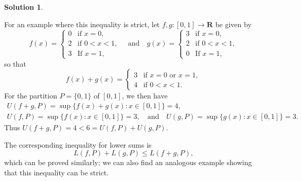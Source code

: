 \documentclass[12pt]{article}
\theoremstyle{definition}
\theoremstyle{exercise}
\theoremstyle{solution}
\newtheorem*{solution}{Solution}
\newcommand{\quand}{\quad \text{and} \quad}
\newcommand{\R}{\mathbf{R}}
\begin{document}
\begin{solution}
\begin{enumerate}
        For an example where this inequality is strict, let \( f, g : [0, 1] \to \R \) be given by
        \[
            f(x) = \begin{cases}
                0 & \text{if } x = 0, \\
                2 & \text{if } 0 < x < 1, \\
                3 & \text{If } x = 1,
            \end{cases}
            \quand
            g(x) = \begin{cases}
                3 & \text{if } x = 0, \\
                2 & \text{if } 0 < x < 1, \\
                0 & \text{If } x = 1,
            \end{cases}
        \]
        so that
        \[
            f(x) + g(x) = \begin{cases}
                3 & \text{if } x = 0 \text{ or } x = 1, \\
                4 & \text{if } 0 < x < 1.
            \end{cases}
        \]
        For the partition \( P = \{ 0, 1 \} \) of \( [0, 1] \), we then have
        \begin{gather*}
            U(f + g, P) = \sup \{ f(x) + g(x) : x \in [0, 1] \} = 4, \\[2mm]
            U(f, P) = \sup \{ f(x) : x \in [0, 1] \} = 3, \quand U(g, P) = \sup \{ g(x) : x \in [0, 1] \} = 3.
        \end{gather*}
        Thus \( U(f + g, P) = 4 < 6 = U(f, P) + U(g, P) \).
        
        The corresponding inequality for lower sums is
        \[
            L(f, P) + L(g, P) \leq L(f + g, P),
        \]
        which can be proved similarly; we can also find an analogous example showing that this inequality can be strict.


\end{enumerate}
\end{solution}
\end{document}
